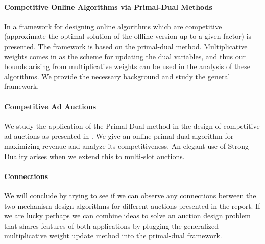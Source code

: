 \documentclass[letterpaper,12pt,oneside,onecolumn]{article}
\begin{document}
\paragraph{Competitive Online Algorithms via Primal-Dual Methods}
In \cite{buchbinder2009design} a framework for designing online algorithms which are competitive (approximate the optimal solution of the offline version up to a given factor) is presented. The framework is based on the primal-dual method. Multiplicative weights comes in as the scheme for updating the dual variables, and thus our bounds arising from multiplicative weights can be used in the analysis of these algorithms. We provide the necessary background and study the general framework.
\paragraph{Competitive Ad Auctions}
We study the application of the Primal-Dual method in the design of competitive ad auctions as presented in \cite{buchbinder2007online}. We give an online primal dual algorithm for maximizing revenue and analyze its competitiveness. An elegant use of Strong Duality arises when we extend this to multi-slot auctions. 
\paragraph{Connections}
We will conclude by trying to see if we can observe any connections between the two mechanism design algorithms for different auctions presented in the report. If we are lucky perhaps we can combine ideas to solve an auction design problem that shares features of both applications by plugging the generalized multiplicative weight update method into the primal-dual framework.


\end{document}

